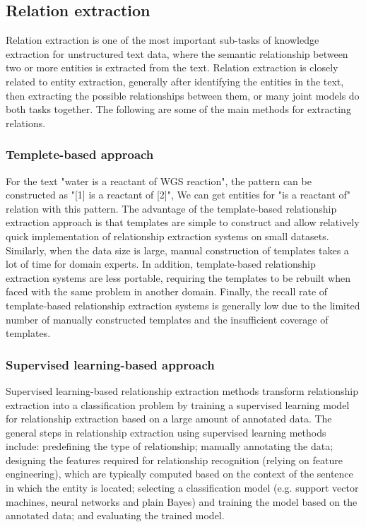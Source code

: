 \documentclass[%
 aip,
 jmp,%
 amsmath,amssymb,
 reprint,%
]{revtex4-2}
\begin{document}
\subsection{Relation extraction}
Relation extraction is one of the most important sub-tasks of knowledge extraction for 
unstructured text data, where the semantic relationship between two or more entities is extracted 
from the text. Relation extraction is closely related to entity extraction, generally after 
identifying the entities in the text, then extracting the possible relationships between them, 
or many joint models do both tasks together. The following are some of the main methods
for extracting relations.

\subsubsection{Templete-based approach}
For the text "water is a reactant of WGS reaction", the pattern can be constructed as "[1] is a reactant of [2]",
We can get entities for "is a reactant of" relation with this pattern. The advantage of the template-based relationship 
extraction approach is that templates are simple to construct and allow relatively quick implementation of relationship 
extraction systems on small datasets. Similarly, when the data size is large, manual construction of templates takes 
a lot of time for domain experts. In addition, template-based relationship extraction systems are less portable, 
requiring the templates to be rebuilt when faced with the same problem in another domain. 
Finally, the recall rate of template-based relationship extraction systems is generally low due to 
the limited number of manually constructed templates and the insufficient coverage of templates.

\subsubsection{Supervised learning-based approach}
Supervised learning-based relationship extraction methods transform relationship extraction into a classification 
problem by training a supervised learning model for relationship extraction based on a large amount of annotated 
data. The general steps in relationship extraction using supervised learning methods include: predefining the 
type of relationship; manually annotating the data; designing the features required for relationship recognition 
(relying on feature engineering), which are typically computed based on the context of the sentence 
in which the entity is located; selecting a classification model (e.g. support vector machines, 
neural networks and plain Bayes) and training the model based on the annotated data; 
and evaluating the trained model.
\end{document}
